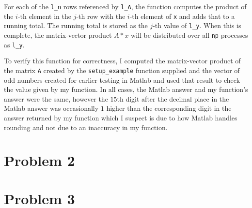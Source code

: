 \documentclass[11pt]{article}
\begin{document}
For each of the \texttt{l\_n} rows referenced by \texttt{l\_A}, the function computes the product of the $i$-th element in the $j$-th row with the $i$-th element of \texttt{x} and adds that to a running total. The running total is stored as the $j$-th value of \texttt{l\_y}. When this is complete, the matrix-vector product $A*x$ will be distributed over all \texttt{np} processes as \texttt{l\_y}.

To verify this function for correctness, I computed the matrix-vector product of the matrix \texttt{A} created by the \texttt{setup\_example} function supplied and the vector of odd numbers created for earlier testing in Matlab and used that result to check the value given by my function. In all cases, the Matlab answer and my function's answer were the same, however the $15$th digit after the decimal place in the Matlab answer was occasionally $1$ higher than the corresponding digit in the answer returned by my function which I suspect is due to how Matlab handles rounding and not due to an inaccuracy in my function.
\pagebreak
\section{Problem 2}

\pagebreak

\section{Problem 3}
\end{document}
